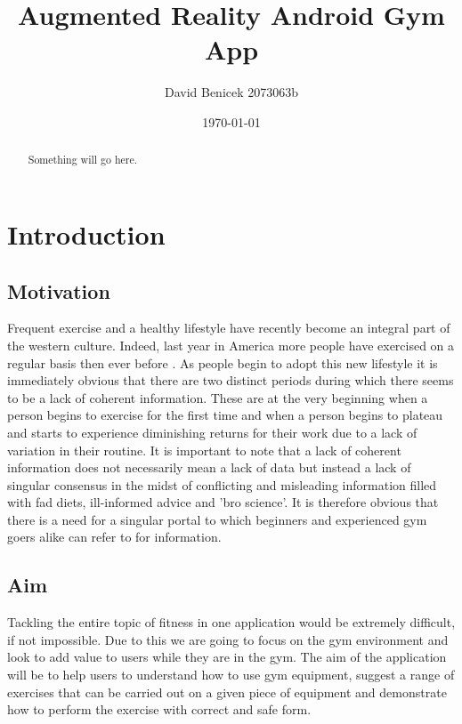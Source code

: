 \documentclass{l4proj}
\begin{document}
\title{Augmented Reality Android Gym App}
\author{David Benicek 2073063b}
\date{\today}
\maketitle

\begin{abstract}
Something will go here.
\end{abstract}

\educationalconsent
%
%
\tableofcontents

\chapter{Introduction}
\section{Motivation}
Frequent exercise and a healthy lifestyle have recently become an integral part of the western culture. Indeed, last year in America more people have exercised on a regular basis then ever before \cite{USexercise}. As people begin to adopt this new lifestyle it is immediately obvious that there are two distinct periods during which there seems to be a lack of coherent information. These are at the very beginning when a person begins to exercise for the first time and when a person begins to plateau and starts to experience diminishing returns for their work due to a lack of variation in their routine. It is important to note that a lack of coherent information does not necessarily mean a lack of data but instead a lack of singular consensus in the midst of conflicting and misleading information filled with fad diets, ill-informed advice and 'bro science'. It is therefore obvious that there is a need for a singular portal to which beginners and experienced gym goers alike can refer to for information. 

\section{Aim}
Tackling the entire topic of fitness in one application would be extremely difficult, if not impossible. Due to this we are going to focus on the gym environment and look to add value to users while they are in the gym. The aim of the application will be to help users to understand how to use gym equipment, suggest a range of exercises that can be carried out on a given piece of equipment and demonstrate how to perform the exercise with correct and safe form. 
\end{document}
